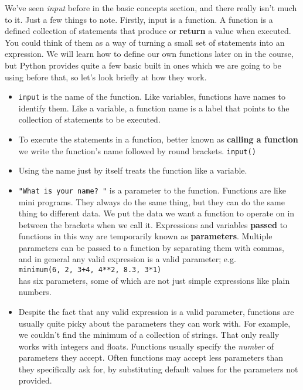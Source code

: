 We've seen \textit{input} before in the basic concepts section, and     there really isn't much to it. Just a few things to note.     Firstly, input is a function. A function is a defined collection of     statements that produce or \textbf{return} a value when     executed. You could think of them as a way of turning a small set of     statements into an expression. We will learn how to define our own     functions later on in the course, but Python provides quite a few basic     built in ones which we are going to be using before that, so let's look     briefly at how they work.
\begin{itemize}
	\item 
\texttt{input} is the name of the function. Like       variables, functions have names to identify them. Like a variable,       a function name is a label that points to the collection of       statements to be executed.
	\item To execute the statements in a function, better known as       \textbf{calling a function} we write the function's name       followed by round brackets. 
\texttt{input()}
	\item Using the name just by itself treats the function like a       variable. 
	\item 
\texttt{"What is your name? "} is a parameter to the       function. Functions are like mini programs. They always do the same       thing, but they can do the same thing to different data. We put the       data we want a function to operate on in between the brackets when       we call it. Expressions and variables \textbf{passed} to       functions in this way are temporarily known as       \textbf{parameters}. Multiple parameters can be passed to a       function by separating them with commas, and in general any valid       expression is a valid parameter; e.g.
\\
\texttt{minimum(6, 2,         3+4, 4**2, 8.3, 3*1)}
\\ has six parameters, some of which       are not just simple expressions like plain numbers.
	\item Despite the fact that any valid expression is a valid       parameter, functions are usually quite picky about the parameters       they can work with. For example, we couldn't find the minimum of a       collection of strings. That only really works with integers and       floats. Functions usually specify the \textit{number} of parameters       they accept. Often functions may accept less parameters than they       specifically ask for, by substituting default values for the       parameters not provided. 
\end{itemize}

